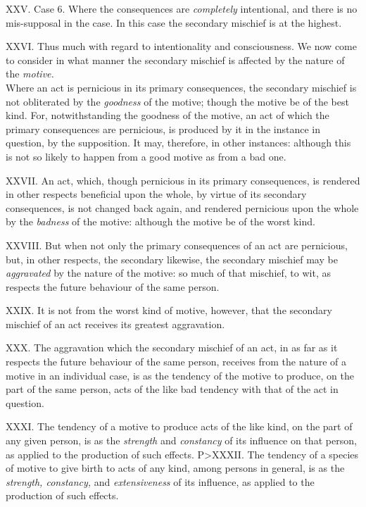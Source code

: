 \documentclass[12pt]{report}
\begin{document}
XXV. Case 6. Where the consequences are \emph{completely} intentional,
and there is no mis-supposal in the case. In this case the secondary
mischief is at the highest.

XXVI. Thus much with regard to intentionality and consciousness. We now
come to consider in what manner the secondary mischief is affected by
the nature of the \emph{motive.}\\
Where an act is pernicious in its primary consequences, the secondary
mischief is not obliterated by the \emph{goodness} of the motive; though
the motive be of the best kind. For, notwithstanding the goodness of the
motive, an act of which the primary consequences are pernicious, is
produced by it in the instance in question, by the supposition. It may,
therefore, in other instances: although this is not so likely to happen
from a good motive as from a bad one.

XXVII. An act, which, though pernicious in its primary consequences, is
rendered in other respects beneficial upon the whole, by virtue of its
secondary consequences, is not changed back again, and rendered
pernicious upon the whole by the \emph{badness} of the motive: although
the motive be of the worst kind.

XXVIII. But when not only the primary consequences of an act are
pernicious, but, in other respects, the secondary likewise, the
secondary mischief may be \emph{aggravated} by the nature of the motive:
so much of that mischief, to wit, as respects the future behaviour of
the same person.

XXIX. It is not from the worst kind of motive, however, that the
secondary mischief of an act receives its greatest aggravation.

XXX. The aggravation which the secondary mischief of an act, in as far
as it respects the future behaviour of the same person, receives from
the nature of a motive in an individual case, is as the tendency of the
motive to produce, on the part of the same person, acts of the like bad
tendency with that of the act in question.

XXXI. The tendency of a motive to produce acts of the like kind, on the
part of any given person, is as the \emph{strength} and \emph{constancy}
of its influence on that person, as applied to the production of such
effects. P\textgreater{}XXXII. The tendency of a species of motive to
give birth to acts of any kind, among persons in general, is as the
\emph{strength, constancy,} and \emph{extensiveness} of its influence,
as applied to the production of such effects.
\end{document}

